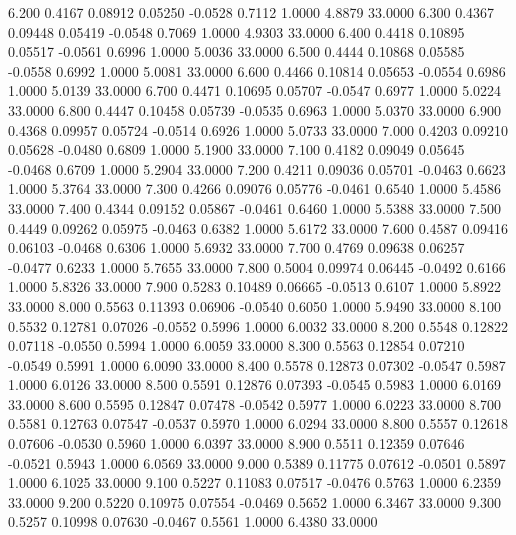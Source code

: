    6.200   0.4167   0.08912   0.05250  -0.0528   0.7112   1.0000   4.8879  33.0000
   6.300   0.4367   0.09448   0.05419  -0.0548   0.7069   1.0000   4.9303  33.0000
   6.400   0.4418   0.10895   0.05517  -0.0561   0.6996   1.0000   5.0036  33.0000
   6.500   0.4444   0.10868   0.05585  -0.0558   0.6992   1.0000   5.0081  33.0000
   6.600   0.4466   0.10814   0.05653  -0.0554   0.6986   1.0000   5.0139  33.0000
   6.700   0.4471   0.10695   0.05707  -0.0547   0.6977   1.0000   5.0224  33.0000
   6.800   0.4447   0.10458   0.05739  -0.0535   0.6963   1.0000   5.0370  33.0000
   6.900   0.4368   0.09957   0.05724  -0.0514   0.6926   1.0000   5.0733  33.0000
   7.000   0.4203   0.09210   0.05628  -0.0480   0.6809   1.0000   5.1900  33.0000
   7.100   0.4182   0.09049   0.05645  -0.0468   0.6709   1.0000   5.2904  33.0000
   7.200   0.4211   0.09036   0.05701  -0.0463   0.6623   1.0000   5.3764  33.0000
   7.300   0.4266   0.09076   0.05776  -0.0461   0.6540   1.0000   5.4586  33.0000
   7.400   0.4344   0.09152   0.05867  -0.0461   0.6460   1.0000   5.5388  33.0000
   7.500   0.4449   0.09262   0.05975  -0.0463   0.6382   1.0000   5.6172  33.0000
   7.600   0.4587   0.09416   0.06103  -0.0468   0.6306   1.0000   5.6932  33.0000
   7.700   0.4769   0.09638   0.06257  -0.0477   0.6233   1.0000   5.7655  33.0000
   7.800   0.5004   0.09974   0.06445  -0.0492   0.6166   1.0000   5.8326  33.0000
   7.900   0.5283   0.10489   0.06665  -0.0513   0.6107   1.0000   5.8922  33.0000
   8.000   0.5563   0.11393   0.06906  -0.0540   0.6050   1.0000   5.9490  33.0000
   8.100   0.5532   0.12781   0.07026  -0.0552   0.5996   1.0000   6.0032  33.0000
   8.200   0.5548   0.12822   0.07118  -0.0550   0.5994   1.0000   6.0059  33.0000
   8.300   0.5563   0.12854   0.07210  -0.0549   0.5991   1.0000   6.0090  33.0000
   8.400   0.5578   0.12873   0.07302  -0.0547   0.5987   1.0000   6.0126  33.0000
   8.500   0.5591   0.12876   0.07393  -0.0545   0.5983   1.0000   6.0169  33.0000
   8.600   0.5595   0.12847   0.07478  -0.0542   0.5977   1.0000   6.0223  33.0000
   8.700   0.5581   0.12763   0.07547  -0.0537   0.5970   1.0000   6.0294  33.0000
   8.800   0.5557   0.12618   0.07606  -0.0530   0.5960   1.0000   6.0397  33.0000
   8.900   0.5511   0.12359   0.07646  -0.0521   0.5943   1.0000   6.0569  33.0000
   9.000   0.5389   0.11775   0.07612  -0.0501   0.5897   1.0000   6.1025  33.0000
   9.100   0.5227   0.11083   0.07517  -0.0476   0.5763   1.0000   6.2359  33.0000
   9.200   0.5220   0.10975   0.07554  -0.0469   0.5652   1.0000   6.3467  33.0000
   9.300   0.5257   0.10998   0.07630  -0.0467   0.5561   1.0000   6.4380  33.0000
